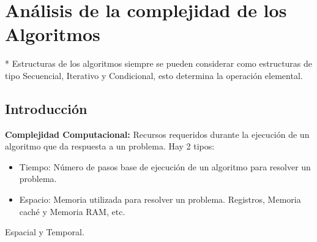\chapter{Análisis de la complejidad de los Algoritmos}\label{ch:análisis-de-la-complejidad-de-los-algoritmos}
* Estructuras de los algoritmos siempre se pueden considerar como estructuras de tipo Secuencial, Iterativo y Condicional, esto determina la operación elemental.

\section{Introducción}\label{sec:introduccion}
\textbf{Complejidad Computacional:} Recursos requeridos durante la ejecución de un algoritmo que da respuesta a un problema. Hay 2 tipos:
\begin{itemize}
  \item Tiempo: Número de pasos base de ejecución de un algoritmo para resolver un problema.
  \item Espacio: Memoria utilizada para resolver un problema. Registros, Memoria caché y Memoria RAM, etc.
\end{itemize}
Espacial y Temporal.


